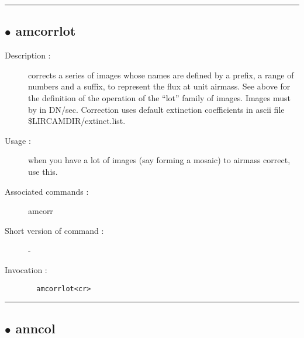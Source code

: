 \hrule \subsection*{$\bullet$ amcorrlot}
\begin{description}
\item[Description :] corrects a series of images whose names are defined by a
prefix, a range of numbers and a suffix, to represent the flux at unit
airmass.  See above for the definition of the operation of the ``lot''
family of images. Images must by in DN/sec.  Correction uses default
extinction coefficients in ascii file \$LIRCAMDIR/extinct.list.
\item[Usage :] when you have a lot of images (say forming a mosaic) to airmass
correct, use this.
\item[Associated commands :] amcorr
\item[Short version of command :] -
\item[Invocation :]

\verb+  amcorrlot<cr> +\end{description}

\hrule \subsection*{$\bullet$ anncol}

